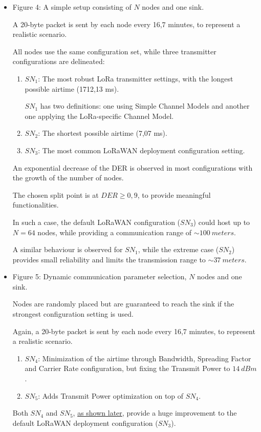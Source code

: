 \documentclass[a4paper,11pt]{article} %
\begin{document}
    \begin{itemize}
        \item Figure 4: A simple setup consisting of $N$ nodes and one sink.

        A 20-byte packet is sent by each node every 16,7 minutes, to represent a realistic scenario.

        All nodes use the same configuration set, while three transmitter configurations are delineated:
        \begin{enumerate}
            \label{description-sn1}
            \item $SN_1$: The most robust LoRa transmitter settings, with the longest possible airtime (1712,13 ms).

            $SN_1$ has two definitions: one using Simple Channel Models and another one applying the LoRa-specific Channel Model.
            \item $SN_2$: The shortest possible airtime (7,07 ms).
            \item $SN_3$: The most common LoRaWAN deployment configuration setting.
        \end{enumerate}

        An exponential decrease of the \textsc{DER} is observed in most configurations with the growth of the number of nodes.

        The chosen split point is at $DER \geq 0,9$, to provide meaningful functionalities.

        In such a case, the default LoRaWAN configuration ($SN_3$) could host up to $N = 64$ nodes, while providing a communication range of $\sim 100\ meters$.

        A similar behaviour is observed for $SN_1$, while the extreme case ($SN_2$) provides small reliability and limits the transmission range to $\sim 37\ meters$.
        \item Figure 5: Dynamic communication parameter selection, $N$ nodes and one sink.

        Nodes are randomly placed but are guaranteed to reach the sink if the strongest configuration setting is used.

        Again, a 20-byte packet is sent by each node every 16,7 minutes, to represent a realistic scenario.
        \begin{enumerate}
            \item $SN_4$: Minimization of the airtime through Bandwidth, Spreading Factor and Carrier Rate configuration, but fixing the Transmit Power to $14\ dBm$.
            \item $SN_5$: Adds Transmit Power optimization on top of $SN_4$.
        \end{enumerate}
        Both $SN_4$ and $SN_5$, \hyperref[subsec:experimental-results]{as shown later}, provide a huge improvement to the default LoRaWAN deployment configuration ($SN_3$).


\end{itemize}
\end{document}
